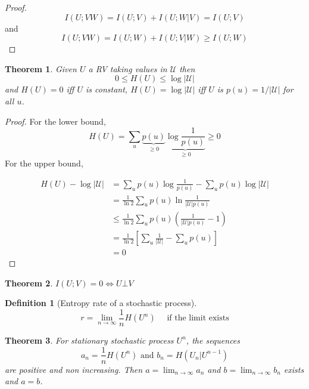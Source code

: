 \documentclass[twoside]{article}
\newtheorem{theorem}{Theorem}[section]
\newtheorem{definition}{Definition}[section]
\theoremstyle{definition} %
\def\U{\mathcal{U}}
\begin{document}
\begin{proof}
  \[
    I(U;VW) = I(U;V) + I(U;W|V) = I(U;V)
  \]
  and
  \[
    I(U;VW) = I(U;W) + I(U;V|W) \geq I(U;W)
  \]
\end{proof}

\begin{theorem}
  Given $U$ a RV taking values in $\U$ then
  \[
    0 \leq H(U) \leq \log | \U |
  \]
  and $H(U)=0$ iff $U$ is constant, $H(U)=\log | \U |$ iff $U$ is $p(u) = 1 / |\U|$ for all $u$.
\end{theorem}

\begin{proof}
For the lower bound,
  \[
    H(U) = \sum_u \underbrace{p(u)}_{\geq 0} \underbrace{\log \frac 1 {p(u)}}_{\geq 0} \geq 0
  \]
For the upper bound,

\begin{align*}
  H(U) - \log | \U |
  &= \sum_u p(u) \log \frac 1 {p(u)} - \sum_u p(u) \log |\U|\\
  &= \frac 1 {\ln 2} \sum_u p(u) \ln \frac 1 {|\U | p(u)}\\
  &\leq \frac 1 {\ln 2} \sum_u p(u) \left(\frac 1 {|\U | p(u)} - 1 \right)\\
  &=\frac 1 {\ln 2} \left[ \sum_u \frac 1 {|\U |} - \sum_u p(u) \right]\\
  &=0
\end{align*}
\end{proof}

\begin{theorem}
  $I(U;V) = 0 \iff U \bot V$
\end{theorem}


\begin{definition}[Entropy rate of a stochastic process]
\[
  r = \lim_{n\to \infty} \frac 1 n H(U^n) \quad \text{ if the limit exists}
\]
\end{definition}

\begin{theorem}
  For stationary stochastic process $U^n$, the sequences
  \[
    a_n = \frac 1 n H(U^n) \text{ and } b_n = H(U_n|U^{n-1})
  \]
  are positive and non increasing. Then $a=\lim_{n\to \infty} a_n$ and $b=\lim_{n\to \infty} b_n$ exists and $a=b$.
\end{theorem}
\end{document}
